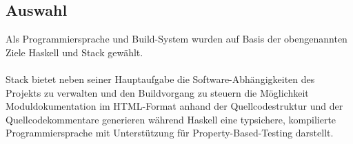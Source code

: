 \subsection{Auswahl}
Als Programmiersprache und Build-System wurden auf Basis der obengenannten Ziele
Haskell \cite{haskell} und Stack \cite{stack} gewählt.

\paragraph{}
Stack bietet neben seiner Hauptaufgabe die Software-Abhängigkeiten des Projekts
zu verwalten und den Buildvorgang zu steuern die Möglichkeit Moduldokumentation
im HTML-Format anhand der Quellcodestruktur und der Quellcodekommentare generieren
während Haskell eine typsichere, kompilierte Programmiersprache mit Unterstützung
für \gls{Property-Based-Testing} darstellt.